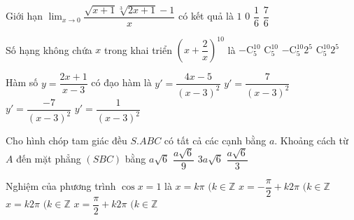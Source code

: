 \begin{ex}%
Giới hạn $\displaystyle\lim_{x\to 0}\dfrac{\sqrt{x+1}\sqrt[3]{2x+1}-1}{x}$ có kết quả là
\choice
{$1$}
{$0$}
{$\dfrac{1}{6}$}
{\True $\dfrac{7}{6}$}
\end{ex}

\begin{ex}%
Số hạng không chứa $x$ trong khai triển $\left(x+\dfrac{2}{x}\right)^{10}$ là
\choice
{$-\mathrm{C}_5^{10}$}
{$\mathrm{C}_5^{10}$}
{$-\mathrm{C}_5^{10} 2^5$}
{\True $\mathrm{C}_5^{10} 2^5$}
\end{ex}

\begin{ex}%
Hàm số $y=\dfrac{2x+1}{x-3}$ có đạo hàm là
\choice
{$y'=\dfrac{4x-5}{(x-3)^2}$}
{$y'=\dfrac{7}{(x-3)^2}$}
{\True $y'=\dfrac{-7}{(x-3)^2}$}
{$y'=\dfrac{1}{(x-3)^2}$}
\end{ex}

\begin{ex}%
Cho hình chóp tam giác đều $S.ABC$ có tất cả các cạnh bằng $a$. Khoảng cách từ $A$ đến mặt phẳng $(SBC)$ bằng
\choice
{$a\sqrt{6}$}
{$\dfrac{a\sqrt{6}}{9}$}
{$3a\sqrt{6}$}
{\True $\dfrac{a\sqrt{6}}{3}$}
\end{ex}

\begin{ex}%
Nghiệm của phương trình $\cos x = 1$ là
\choice
{$x=k\pi$ $(k \in \mathbb{Z}$}
{$x=-\dfrac{\pi}{2}+k2\pi$ $(k \in \mathbb{Z}$}
{\True $x=k2\pi$ $(k \in \mathbb{Z}$}
{$x=\dfrac{\pi}{2}+k2\pi$ $(k \in \mathbb{Z}$}
\end{ex}

